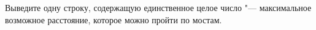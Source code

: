 Выведите одну строку, содержащую единственное целое число "--- максимальное
возможное расстояние, которое можно пройти по мостам.

